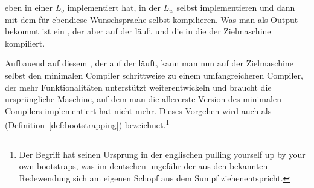 eben in einer  $L_o$ implementiert hat, in der  $L_w$ selbst implementieren und dann mit dem  für ebendiese Wunschsprache selbst kompilieren. Was man als Output bekommt ist ein , der aber auf der  läuft und die  in die  der Zielmaschine kompiliert.

Aufbauend auf diesem , der auf der  läuft, kann man nun auf der Zielmaschine selbst  den minimalen Compiler schrittweise zu einem umfangreicheren Compiler, der mehr Funktionalitäten unterstützt weiterentwickeln und braucht die ursprüngliche Maschine, auf dem man die allererste Version des minimalen Compilers implementiert hat nicht mehr. Dieses Vorgehen wird auch als  (Definition~\ref{def:bootstrapping}) bezeichnet.\footnote{Der Begriff hat seinen Ursprung in der englischen  \glqq pulling yourself up by your own bootstraps\grqq, was im deutschen ungefähr der aus den  bekannten Redewendung \glqq sich am eigenen Schopf aus dem Sumpf ziehen\grqq entspricht.}

